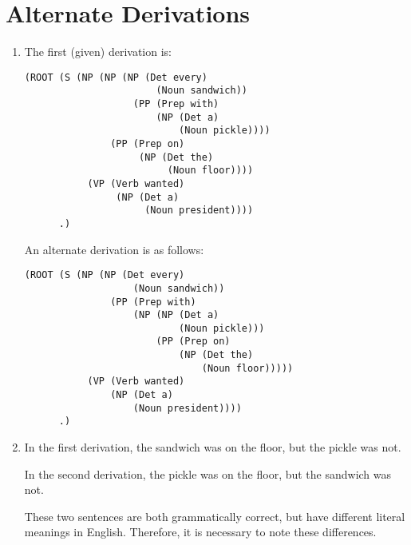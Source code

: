 \documentclass[11pt]{article}
\begin{document}
\section{Alternate Derivations}
\begin{enumerate}
\item 
	The first (given) derivation is:
\begin{lstlisting}
(ROOT (S (NP (NP (NP (Det every) 
                       (Noun sandwich)) 
                   (PP (Prep with) 
                       (NP (Det a) 
                           (Noun pickle)))) 
               (PP (Prep on) 
                    (NP (Det the) 
                         (Noun floor)))) 
           (VP (Verb wanted) 
                (NP (Det a) 
                     (Noun president))))
      .)
\end{lstlisting}
      
      An alternate derivation is as follows:
\begin{lstlisting}
(ROOT (S (NP (NP (Det every)
                   (Noun sandwich)) 
               (PP (Prep with) 
                   (NP (NP (Det a) 
                           (Noun pickle)))
                       (PP (Prep on) 
                           (NP (Det the) 
                               (Noun floor)))))
           (VP (Verb wanted) 
               (NP (Det a) 
                   (Noun president))))
      .)
\end{lstlisting}
\item
	In the first derivation, the sandwich was on the floor, but the pickle was not. 
	
	In the second derivation, the pickle was on the floor, but the sandwich was not. 
	
	These two sentences are both grammatically correct, but have different literal meanings in English. Therefore, it is necessary to note these differences.
\end{enumerate}

\newpage
\end{document}
